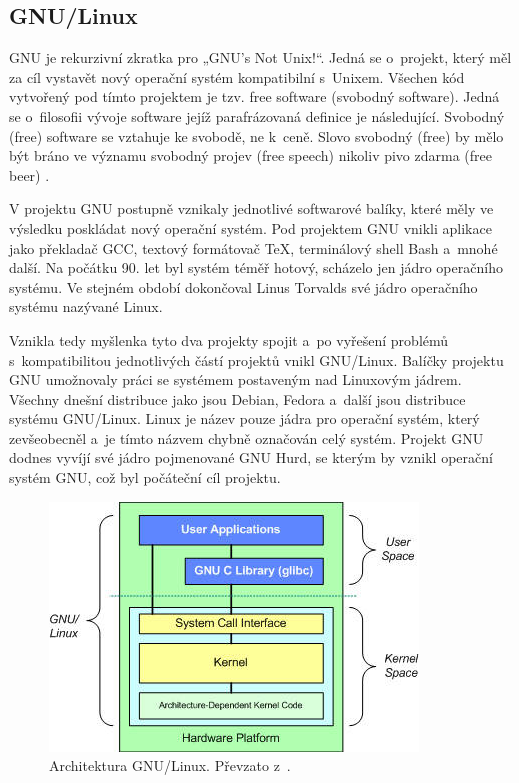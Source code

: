 \subsection{GNU/Linux}

GNU je rekurzivní zkratka pro „GNU's Not Unix!“. Jedná se o projekt, který měl za cíl vystavět nový operační systém kompatibilní s Unixem. Všechen kód vytvořený pod
tímto projektem je tzv. free software (svobodný software). Jedná se o filosofii vývoje software jejíž parafrázovaná definice je následující. Svobodný (free) software se
vztahuje ke svobodě, ne k ceně. Slovo svobodný (free) by mělo být bráno ve významu svobodný projev (free speech) nikoliv pivo zdarma (free beer) \cite{FreeSoftware}.

V projektu GNU postupně vznikaly jednotlivé softwarové balíky, které měly ve výsledku poskládat nový operační systém. Pod projektem GNU vnikli aplikace jako překladač GCC,
textový formátovač TeX, terminálový shell Bash a mnohé další. Na počátku 90. let byl systém téměř hotový, scházelo jen jádro operačního systému. Ve stejném období dokončoval
Linus Torvalds své jádro operačního systému nazývané Linux. \cite{GNULinux} \cite{GNULinux2} 

Vznikla tedy myšlenka tyto dva projekty spojit a po vyřešení problémů s kompatibilitou jednotlivých částí projektů vnikl GNU/Linux. Balíčky projektu GNU umožnovaly práci
se systémem postaveným nad Linuxovým jádrem. Všechny dnešní distribuce jako jsou Debian, Fedora a další jsou distribuce systému GNU/Linux. Linux je název pouze jádra pro 
operační systém, který zevšeobecněl a je tímto názvem chybně označován celý systém. Projekt GNU dodnes vyvíjí své jádro pojmenované GNU Hurd, se kterým by vznikl operační
systém GNU, což byl počáteční cíl projektu. \cite{GNULinux2}

\begin{figure}[h]
    \centering
    \includegraphics[width=0.6\linewidth]{other-fig/userspace.jpg}
    \caption{Architektura GNU/Linux. Převzato z \cite{Userspace}.}
    \label{fig:gnu_linux_architecture}
\end{figure}

